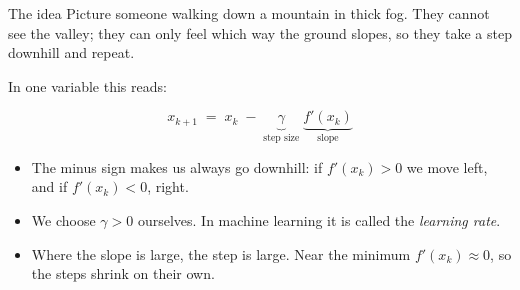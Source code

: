 \documentclass[aspectratio=169,10pt]{beamer}
\begin{document}
\begin{frame}{The idea}
  Picture someone walking down a mountain in thick fog. They cannot see the valley; they can only feel which way the ground slopes, so they take a step downhill and repeat.
  \medskip

  In one variable this reads:
  \begin{ecuacion}
    \[
      x_{k+1} \;=\; x_k \;-\; \underbrace{\gamma}_{\text{step size}}\;\underbrace{f'(x_k)}_{\text{slope}}
    \]
  \end{ecuacion}
  \begin{itemize}
    \item The minus sign makes us always go downhill: if $f'(x_k)>0$ we move left, and if $f'(x_k)<0$, right.
    \item We choose $\gamma>0$ ourselves. In machine learning it is called the \emph{learning rate}.
    \item Where the slope is large, the step is large. Near the minimum $f'(x_k)\approx 0$, so the steps shrink on their own.
  \end{itemize}
\end{frame}
\end{document}
